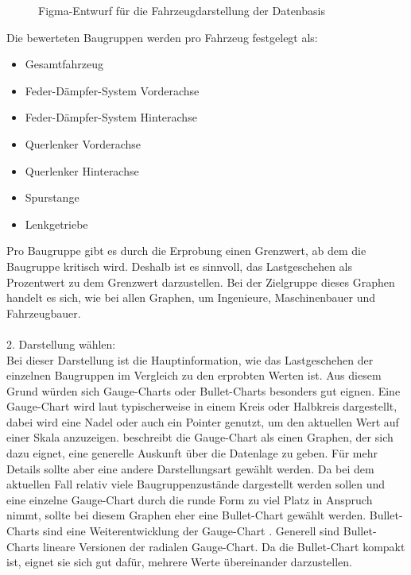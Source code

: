 \begin{figure}[h!]
\centering
{}
\caption{Figma-Entwurf für die Fahrzeugdarstellung der Datenbasis}
\label{fig:datenbasis}
\end{figure}
Die bewerteten Baugruppen werden pro Fahrzeug festgelegt als:
\begin{multicols}{2}
\begin{itemize}
    \item Gesamtfahrzeug
    \item Feder-Dämpfer-System Vorderachse
    \item Feder-Dämpfer-System Hinterachse
    \item Querlenker Vorderachse
    \item Querlenker Hinterachse
    \item Spurstange
    \item Lenkgetriebe
\end{itemize}
\end{multicols}
\noindent
Pro Baugruppe gibt es durch die Erprobung einen Grenzwert, ab dem die Baugruppe kritisch wird. Deshalb ist es sinnvoll, das Lastgeschehen als Prozentwert zu dem Grenzwert darzustellen. Bei der Zielgruppe dieses Graphen handelt es sich, wie bei allen Graphen, um Ingenieure, Maschinenbauer und Fahrzeugbauer. \\\\
2. Darstellung wählen:\\
Bei dieser Darstellung ist die Hauptinformation, wie das Lastgeschehen der einzelnen Baugruppen im Vergleich zu den erprobten Werten ist. Aus diesem Grund würden sich Gauge-Charts oder Bullet-Charts besonders gut eignen. Eine Gauge-Chart wird laut \cite{Schwabish.2021} typischerweise in einem Kreis oder Halbkreis dargestellt, dabei wird eine \glqq Nadel\grqq{} oder auch ein Pointer genutzt, um den aktuellen Wert auf einer Skala anzuzeigen. \cite{Schwabish.2021} beschreibt die Gauge-Chart als einen Graphen, der sich dazu eignet, eine generelle Auskunft über die Datenlage zu geben. Für mehr Details sollte aber eine andere Darstellungsart gewählt werden. Da bei dem aktuellen Fall relativ viele Baugruppenzustände dargestellt werden sollen und eine einzelne Gauge-Chart durch die runde Form zu viel Platz in Anspruch nimmt, sollte bei diesem Graphen eher eine Bullet-Chart gewählt werden. Bullet-Charts sind eine Weiterentwicklung der Gauge-Chart \cite{Schwabish.2021}. Generell sind Bullet-Charts lineare Versionen der radialen Gauge-Chart. Da die Bullet-Chart kompakt ist, eignet sie sich gut dafür, mehrere Werte übereinander darzustellen. \\\\
